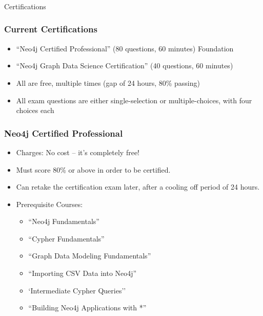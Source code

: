 \begin{frame}[fragile]\frametitle{}
\begin{center}
{\Large Certifications}
\end{center}
\end{frame}

\begin{frame}\frametitle{Current Certifications}
\begin{itemize}
\item  ``Neo4j Certified Professional'' (80 questions, 60 minutes) Foundation
\item ``Neo4j Graph Data Science Certification'' (40 questions, 60 minutes)
\end{itemize}


\begin{itemize}
\item All are free, multiple times (gap of 24 hours, 80\% passing)
\item All exam questions are either single-selection or multiple-choices, with four choices each
\end{itemize}

\end{frame}

\begin{frame}\frametitle{Neo4j Certified Professional}

\begin{itemize}
\item Charges: No cost – it’s completely free!
\item Must score 80\% or above in order to be certified.
\item Can retake the certification exam later, after a cooling off period of 24 hours.
\item Prerequisite Courses:
	\begin{itemize}
	\item ``Neo4j Fundamentals''
	\item ``Cypher Fundamentals''
	\item ``Graph Data Modeling Fundamentals''
	\item ``Importing CSV Data into Neo4j''
	\item `Intermediate Cypher Queries''
	\item ``Building Neo4j Applications with *''
	\end{itemize}
\end{itemize}
\end{frame}



